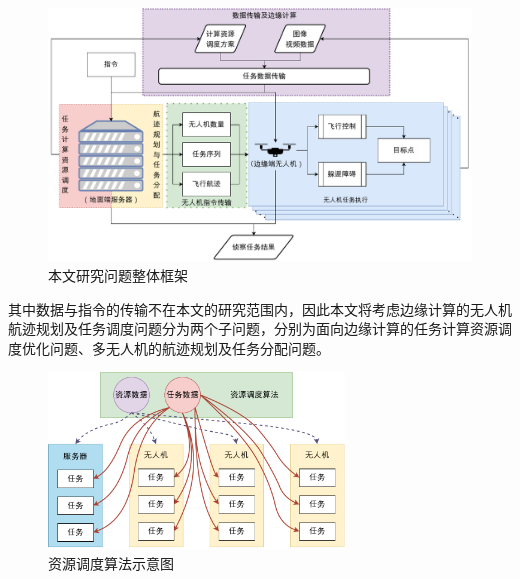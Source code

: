 \begin{figure}[!htbp]
    \centering
    \includegraphics[width=\textwidth]{images/毕设问题框架.pdf}
    \caption{本文研究问题整体框架}
    \label{fig:研究问题整体框架}
\end{figure}

其中数据与指令的传输不在本文的研究范围内，因此本文将考虑边缘计算的无人机航迹规划及任务调度问题分为两个子问题，分别为面向边缘计算的任务计算资源调度优化问题、多无人机的航迹规划及任务分配问题。

\begin{figure}[!htbp]
    \centering
    \includegraphics[width=0.7\textwidth]{images/资源调度算法.pdf}
    \caption{资源调度算法示意图}
    \label{fig:资源调度算法示意图}
\end{figure}


